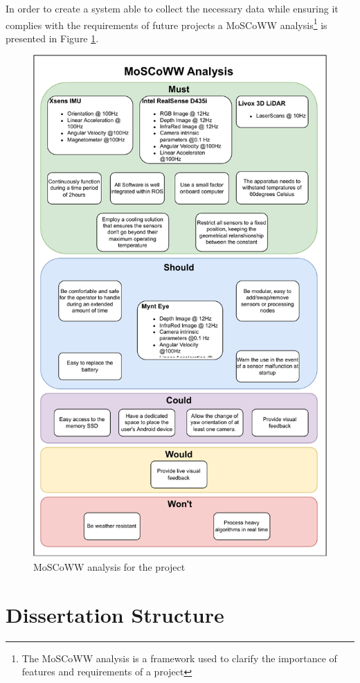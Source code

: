 In order to create a system able to collect the necessary data while ensuring it complies with the requirements of future projects a MoSCoWW analysis\footnote{The MoSCoWW analysis is a framework used to clarify the importance of features and requirements of a project} is presented in Figure \ref{fig: moscoww}.

\begin{figure}[H]
    \centering
    \includegraphics[width=0.65\linewidth]{images/introduction/moscoww_analysis.pdf}
    \caption{MoSCoWW analysis for the project}
    \label{fig: moscoww}
\end{figure}

\section{Dissertation Structure}